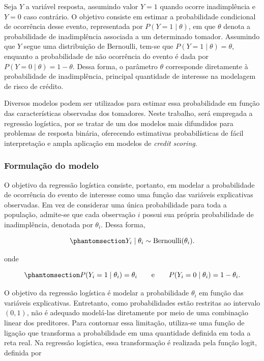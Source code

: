 \documentclass[
  brazilian,
  12pt,
  letterpaper,
  DIV=11,
  numbers=noendperiod]{scrartcl}
\begin{document}
Seja \(Y\) a variável resposta, assumindo valor \(Y = 1\) quando ocorre
inadimplência e \(Y = 0\) caso contrário. O objetivo consiste em estimar
a probabilidade condicional de ocorrência desse evento, representada por
\(P(Y = 1 \mid \theta)\), em que \(\theta\) denota a probabilidade de
inadimplência associada a um determinado tomador. Assumindo que \(Y\)
segue uma distribuição de Bernoulli, tem-se que
\(P(Y = 1 \mid \theta) = \theta\), enquanto a probabilidade de não
ocorrência do evento é dada por \(P(Y = 0 \mid \theta) = 1 - \theta\).
Dessa forma, o parâmetro \(\theta\) corresponde diretamente à
probabilidade de inadimplência, principal quantidade de interesse na
modelagem de risco de crédito.

Diversos modelos podem ser utilizados para estimar essa probabilidade em
função das características observadas dos tomadores. Neste trabalho,
será empregada a regressão logística, por se tratar de um dos modelos
mais difundidos para problemas de resposta binária, oferecendo
estimativas probabilísticas de fácil interpretação e ampla aplicação em
modelos de \emph{credit scoring}.

\subsubsection{Formulação do modelo}\label{formulauxe7uxe3o-do-modelo}

O objetivo da regressão logística consiste, portanto, em modelar a
probabilidade de ocorrência do evento de interesse como uma função das
variáveis explicativas observadas. Em vez de considerar uma única
probabilidade para toda a população, admite-se que cada observação \(i\)
possui sua própria probabilidade de inadimplência, denotada por
\(\theta_i\). Dessa forma,

\begin{equation}\protect\phantomsection\label{eq-bernoulli-model}{
Y_i \mid \theta_i \sim \mathrm{Bernoulli}(\theta_i).
}\end{equation}

onde

\begin{equation}\protect\phantomsection\label{eq-bernoulli-prob}{
P(Y_i = 1 \mid \theta_i) = \theta_i
\qquad \text{e} \qquad
P(Y_i = 0 \mid \theta_i) = 1 - \theta_i.
}\end{equation}

O objetivo da regressão logística é modelar a probabilidade \(\theta_i\)
em função das variáveis explicativas. Entretanto, como probabilidades
estão restritas ao intervalo \((0,1)\), não é adequado modelá-las
diretamente por meio de uma combinação linear dos preditores. Para
contornar essa limitação, utiliza-se uma função de ligação que
transforma a probabilidade em uma quantidade definida em toda a reta
real. Na regressão logística, essa transformação é realizada pela função
logit, definida por
\end{document}
